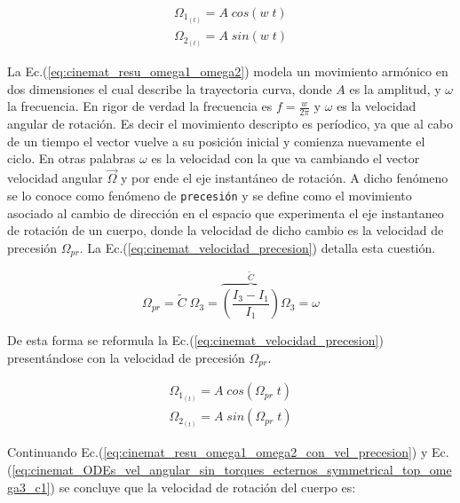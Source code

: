 \documentclass[oneside,a4paper,english,links]{amca}
\begin{document}
\begin{equation}
    \boxed{
    \begin{split}
    \Omega_{1_{(t)}} = A \;cos(w\;t)\\
    \Omega_{2_{(t)}} = A \;sin(w\;t)
    \end{split}}
    \label{eq:cinemat_resu_omega1_omega2}
\end{equation}

La Ec.(\ref{eq:cinemat_resu_omega1_omega2}) modela un movimiento arm\'onico en dos dimensiones el cual describe la trayectoria curva, donde $A$ es la amplitud, y $\omega$ la frecuencia. En rigor de verdad la frecuencia es $f=\frac{w}{2\pi}$ y $\omega$ es la velocidad angular de rotaci\'on. Es decir el movimiento descripto es per\'iodico, ya que al cabo de un tiempo el vector vuelve a su posici\'on inicial y comienza nuevamente el ciclo. En otras palabras $\omega$ es la velocidad con la que va cambiando el vector velocidad angular $\vec{\Omega}$ y por ende el eje instant\'aneo de rotaci\'on. A dicho fen\'omeno se lo conoce como fen\'omeno de \texttt{precesi\'on} y se define como el movimiento asociado al cambio de direcci\'on en el espacio que experimenta el eje instantaneo de rotaci\'on de un cuerpo, donde la velocidad de dicho cambio es la velocidad de precesi\'on $\Omega_{pr}$. La Ec.(\ref{eq:cinemat_velocidad_precesion}) detalla esta cuesti\'on.

\begin{equation}
    \Omega_{pr}= \tilde{C}\;\Omega_3 = \overbrace{\left(\frac{I_3-I_1}{I_1} \right)}^{\tilde{C}}\Omega_3=\omega 
    \label{eq:cinemat_velocidad_precesion}
\end{equation}

De esta forma se reformula la Ec.(\ref{eq:cinemat_velocidad_precesion}) present\'andose con la velocidad de precesi\'on $\Omega_{pr}$.

\begin{equation}
    \boxed{
    \begin{split}
    \Omega_{1_{(t)}} = A \;cos\left(\Omega_{pr}\;t\right)\\
    \Omega_{2_{(t)}} = A \;sin\left(\Omega_{pr}\;t\right)
    \end{split}}\label{eq:cinemat_resu_omega1_omega2_con_vel_precesion}
\end{equation}

Continuando Ec.(\ref{eq:cinemat_resu_omega1_omega2_con_vel_precesion}) y Ec.(\ref{eq:cinemat_ODEs_vel_angular_sin_torques_ecternos_symmetrical_top_omega3_c1}) se concluye que la velocidad de rotaci\'on del cuerpo es:
\end{document}
